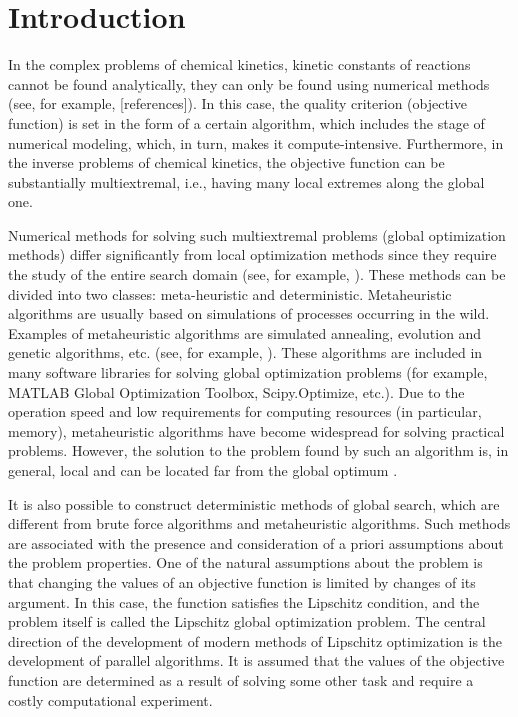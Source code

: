 \documentclass[mathematics,article,submit,pdftex,moreauthors]{Definitions/mdpi}
\begin{document}
\section{Introduction}



In the complex problems of chemical kinetics, kinetic constants of reactions cannot be found analytically, they can only be found using numerical methods (see, for example, [references]). In this case, the quality criterion (objective function) is set in the form of a certain algorithm, which includes the stage of numerical modeling, which, in turn, makes it compute-intensive. Furthermore, in the inverse problems of chemical kinetics, the objective function can be substantially multiextremal, i.e., having many local extremes along the global one. 

Numerical methods for solving such multiextremal problems (global optimization methods) differ significantly from local optimization methods since they require the study of the entire search domain (see, for example, \cite{PaulaviciusZilinskas2014,Sergeyev2017}). These methods can be divided into two classes: meta-heuristic and deterministic. Metaheuristic algorithms are usually based on simulations of processes occurring in the wild.
Examples of metaheuristic algorithms are simulated annealing, evolution and genetic algorithms, etc. (see, for example, \cite{Battiti2009,Eiben2015}).
These algorithms are included in many software libraries for solving global optimization problems (for example, MATLAB Global Optimization Toolbox, Scipy.Optimize, etc.).
Due to the operation speed and low requirements for computing resources (in particular, memory), metaheuristic algorithms have become widespread for solving practical problems. However, the solution to the problem found by such an algorithm is, in general, local and can be located far from the global optimum \cite{Kvasov2018}. 

It is also possible to construct deterministic methods of global search, which are different from brute force algorithms and metaheuristic algorithms. Such methods are associated with the presence and consideration of a priori assumptions about the problem properties. 
One of the natural assumptions about the problem is that changing the values of an objective function is limited by changes of its argument. In this case, the function satisfies the Lipschitz condition, and the problem itself is called the Lipschitz global optimization problem. The central direction of the development of modern methods of Lipschitz optimization is the development of parallel algorithms. It is assumed that the values of the objective function are determined as a result of solving some other task and require a costly computational experiment.
\end{document}
